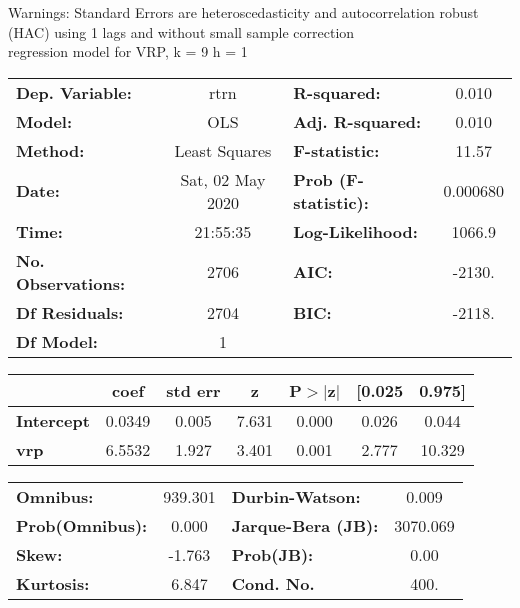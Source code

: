 Warnings: \newline
 [1] Standard Errors are heteroscedasticity and autocorrelation robust (HAC) using 1 lags and without small sample correction\\ 

regression model for VRP, k = 9 h = 1\begin{center}
\begin{tabular}{lclc}
\toprule
\textbf{Dep. Variable:}    &       rtrn       & \textbf{  R-squared:         } &     0.010   \\
\textbf{Model:}            &       OLS        & \textbf{  Adj. R-squared:    } &     0.010   \\
\textbf{Method:}           &  Least Squares   & \textbf{  F-statistic:       } &     11.57   \\
\textbf{Date:}             & Sat, 02 May 2020 & \textbf{  Prob (F-statistic):} &  0.000680   \\
\textbf{Time:}             &     21:55:35     & \textbf{  Log-Likelihood:    } &    1066.9   \\
\textbf{No. Observations:} &        2706      & \textbf{  AIC:               } &    -2130.   \\
\textbf{Df Residuals:}     &        2704      & \textbf{  BIC:               } &    -2118.   \\
\textbf{Df Model:}         &           1      & \textbf{                     } &             \\
\bottomrule
\end{tabular}
\begin{tabular}{lcccccc}
                   & \textbf{coef} & \textbf{std err} & \textbf{z} & \textbf{P$> |$z$|$} & \textbf{[0.025} & \textbf{0.975]}  \\
\midrule
\textbf{Intercept} &       0.0349  &        0.005     &     7.631  &         0.000        &        0.026    &        0.044     \\
\textbf{vrp}       &       6.5532  &        1.927     &     3.401  &         0.001        &        2.777    &       10.329     \\
\bottomrule
\end{tabular}
\begin{tabular}{lclc}
\textbf{Omnibus:}       & 939.301 & \textbf{  Durbin-Watson:     } &    0.009  \\
\textbf{Prob(Omnibus):} &   0.000 & \textbf{  Jarque-Bera (JB):  } & 3070.069  \\
\textbf{Skew:}          &  -1.763 & \textbf{  Prob(JB):          } &     0.00  \\
\textbf{Kurtosis:}      &   6.847 & \textbf{  Cond. No.          } &     400.  \\
\bottomrule
\end{tabular}
\end{center}


